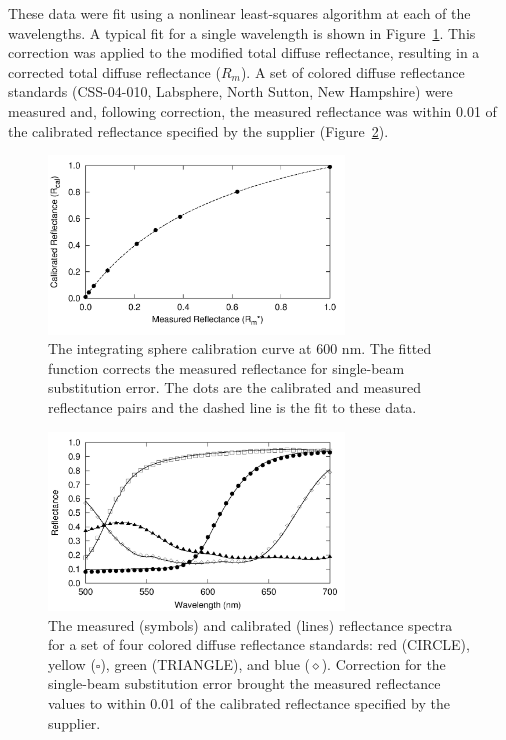 These data were fit using a nonlinear least-squares algorithm at each of the wavelengths. A typical fit for a single wavelength is shown in Figure~\ref{fig:p1-sbse_cf}. This correction was applied to the modified total diffuse reflectance, resulting in a corrected total diffuse reflectance ($R_m$). A set of colored diffuse reflectance standards (CSS-04-010, Labsphere, North Sutton, New Hampshire) were measured and, following correction, the measured reflectance was within 0.01 of the calibrated reflectance specified by the supplier (Figure~\ref{fig:p1-colored_refl}).

\begin{figure}
	\centering \includegraphics[width=0.7\textwidth]{figures/p1-sbse_cf.png}
	\caption[Single-beam substitution error correction curve text]{\label{fig:p1-sbse_cf}The integrating sphere calibration curve at 600 nm. The fitted function corrects the measured reflectance for single-beam substitution error. The dots are the calibrated and measured reflectance pairs and the dashed line is the fit to these data.}
\end{figure}

\begin{figure}
	\centering \includegraphics[width=0.7\textwidth]{figures/p1-colored_refl.png}
	\caption[Measured and calibrated reflectance spectra]{\label{fig:p1-colored_refl}The measured (symbols) and calibrated (lines) reflectance spectra for a set of four colored diffuse reflectance standards: red (CIRCLE), yellow ($\square$), green (TRIANGLE), and blue ($\diamond$). Correction for the single-beam substitution error brought the measured reflectance values to within 0.01 of the calibrated reflectance specified by the supplier.}
\end{figure}

